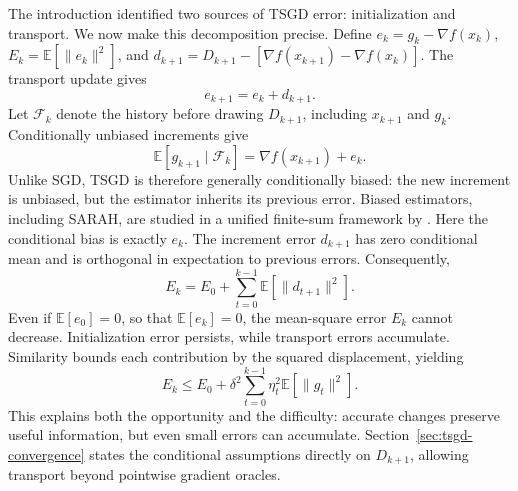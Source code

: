 The introduction identified two sources of TSGD error: initialization
and transport. We now make this decomposition precise.
Define $e_k=g_k-\nabla f(x_k)$, $E_k=\mathbb E[\|e_k\|^2]$, and
$d_{k+1}=D_{k+1}-[\nabla f(x_{k+1})-\nabla f(x_k)]$.
The transport update gives
\begin{equation}
\label{eq:estimation-error-recursion}
\boxed{e_{k+1}=e_k+d_{k+1}.}
\end{equation}
Let $\mathcal F_k$ denote the history before drawing $D_{k+1}$,
including $x_{k+1}$ and $g_k$. Conditionally unbiased increments give
\[
\mathbb E[g_{k+1}\mid\mathcal F_k]
=\nabla f(x_{k+1})+e_k.
\]
Unlike SGD, TSGD is therefore generally conditionally biased:
the new increment is unbiased, but the estimator inherits its previous
error. Biased estimators, including SARAH, are studied in a unified
finite-sum framework by
\citet{driggs2020biasedstochasticgradientestimation}.
Here the conditional bias is exactly $e_k$.
The increment error $d_{k+1}$ has zero conditional mean and is
orthogonal in expectation to previous errors. Consequently,
\begin{equation}
\label{eq:transport-error-identity}
E_k=E_0+\sum_{t=0}^{k-1}\mathbb E[\|d_{t+1}\|^2].
\end{equation}
Even if $\mathbb E[e_0]=0$, so that $\mathbb E[e_k]=0$, the
mean-square error $E_k$ cannot decrease. Initialization error persists,
while transport errors accumulate.
Similarity bounds each contribution by the squared displacement, yielding
\begin{equation}
\label{eq:transport-error-growth}
E_k\leq E_0+\delta^2\sum_{t=0}^{k-1}
\eta_t^2\mathbb E[\|g_t\|^2].
\end{equation}
This explains both the opportunity and the difficulty: accurate changes
preserve useful information, but even small errors can accumulate.
Section~\ref{sec:tsgd-convergence} states the conditional assumptions
directly on $D_{k+1}$, allowing transport beyond pointwise gradient oracles.
